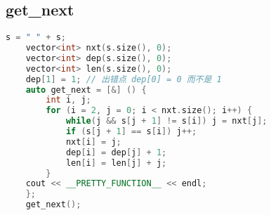 \subsection{get\_next}
\begin{lstlisting}[language=c++]
	s = " " + s;
	vector<int> nxt(s.size(), 0);
	vector<int> dep(s.size(), 0);
	vector<int> len(s.size(), 0);
	dep[1] = 1; // 出错点 dep[0] = 0 而不是 1
	auto get_next = [&] () {
		int i, j;
		for (i = 2, j = 0; i < nxt.size(); i++) {
			while(j && s[j + 1] != s[i]) j = nxt[j];
			if (s[j + 1] == s[i]) j++;
			nxt[i] = j;
			dep[i] = dep[j] + 1;
			len[i] = len[j] + j;
		}
    cout << __PRETTY_FUNCTION__ << endl;
	};
	get_next();
\end{lstlisting}
